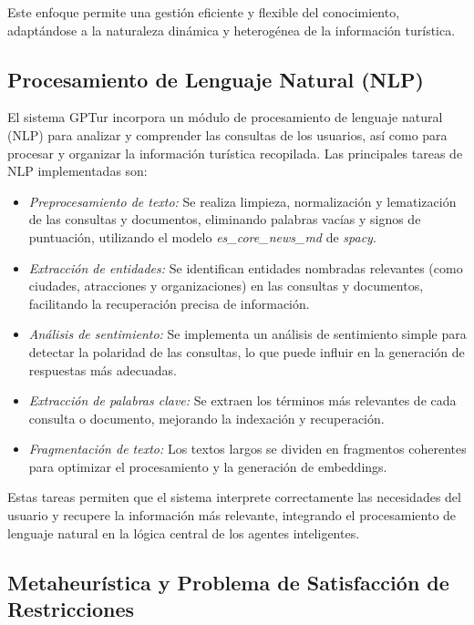 \documentclass[10pt]{llncs}
\begin{document}
Este enfoque permite una gestión eficiente y flexible del conocimiento, adaptándose a la naturaleza dinámica y heterogénea de la información turística.

\vspace{\baselineskip}
\subsection{Procesamiento de Lenguaje Natural (NLP)}

El sistema GPTur incorpora un módulo de procesamiento de lenguaje natural (NLP) para analizar y comprender las consultas de los usuarios, así como para procesar y organizar la información turística recopilada. Las principales tareas de 
NLP implementadas son:

\begin{itemize}
    \item \textit{Preprocesamiento de texto:} Se realiza limpieza, normalización y lematización de las consultas y documentos, eliminando palabras vacías y signos de puntuación, utilizando el modelo \textit{es\_core\_news\_md} de \textit{spacy}.
    \item \textit{Extracción de entidades:} Se identifican entidades nombradas relevantes (como ciudades, atracciones y organizaciones) en las consultas y documentos, facilitando la recuperación precisa de información.
    \item \textit{Análisis de sentimiento:} Se implementa un análisis de sentimiento simple para detectar la polaridad de las consultas, lo que puede influir en la generación de respuestas más adecuadas.
    \item \textit{Extracción de palabras clave:} Se extraen los términos más relevantes de cada consulta o documento, mejorando la indexación y recuperación.
    \item \textit{Fragmentación de texto:} Los textos largos se dividen en fragmentos coherentes para optimizar el procesamiento y la generación de embeddings.
\end{itemize}

Estas tareas permiten que el sistema interprete correctamente las necesidades del usuario y recupere la información más relevante, integrando el procesamiento de lenguaje natural en la lógica central de los agentes inteligentes.

\vspace{\baselineskip}

\subsection{Metaheurística y Problema de Satisfacción de Restricciones}
\end{document}
